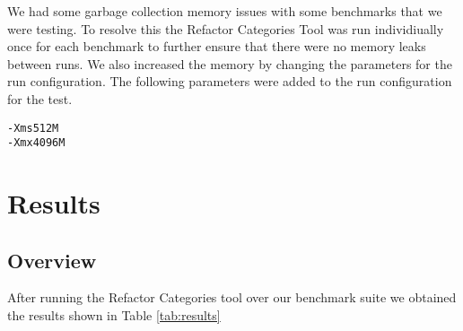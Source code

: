 We had some garbage collection memory issues with some benchmarks that we were testing. 
To resolve this the Refactor Categories Tool was run individiually once for each benchmark to further ensure that there were no memory leaks between runs.
We also increased the memory by changing the parameters for the run configuration.  The following parameters were added to the run configuration for the test.

\begin{verbatim}
-Xms512M 
-Xmx4096M
\end{verbatim}



% 
% 
% 



\section{Results}
\subsection{Overview}
After running the Refactor Categories tool over our benchmark suite we obtained the results shown in Table \ref{tab:results}

